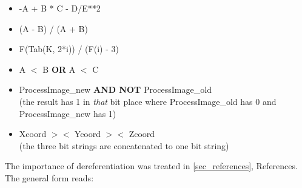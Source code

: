 \begin{itemize}
\item -A + B * C - D/E**2
\item (A - B) / (A + B)
\item F(Tab(K, 2*i)) / (F(i) - 3)
\item A $<$ B {\bf OR} A $<$ C
\item ProcessImage\_new {\bf AND NOT} ProcessImage\_old\\
      (the result has 1 in {\it that} bit place where ProcessImage\_old
      has 0 and ProcessImage\_new has 1)
\item Xcoord $><$ Ycoord $><$ Zcoord\\
      (the three bit strings are concatenated to one bit string)
\end{itemize}


The importance of dereferentiation was treated in
 \ref{sec_references}, References. The
general form reads:

